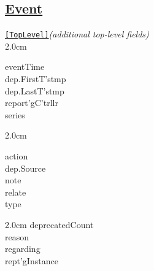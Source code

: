 \subsection*{\href{https://kubernetes.io/docs/concepts/containers/container-lifecycle-hooks/}{Event}}

\texttt{\href{https://kubernetes.io/docs/reference/kubernetes-api/cluster-resources/event-v1/}{[TopLevel]}}\quad\textit{(additional top-level fields)}\\[-2mm]
\api
{2.0cm}{
eventTime       \\
dep.FirstT'stmp \\
dep.LastT'stmp  \\
report'gC'trllr \\
series

}
{2.0cm}{
action          \\
dep.Source      \\
note            \\
relate          \\
type

}
{2.0cm}{
deprecatedCount \\
reason          \\
regarding       \\
rept'gInstance  \\

}
\stopapi



\begin{comment}

\texttt{\href{}{spec}}\quad\textit{()}\\[-2mm]
\api
{2.0cm}{

}
{2.0cm}{

}
{2.0cm}{

}
\stopapi


\texttt{status}\quad\textit{()}\\[-2mm]
\api
{2.0cm}{

}
{2.0cm}{

}
{2.0cm}{

}
\stopapi



\end{comment}